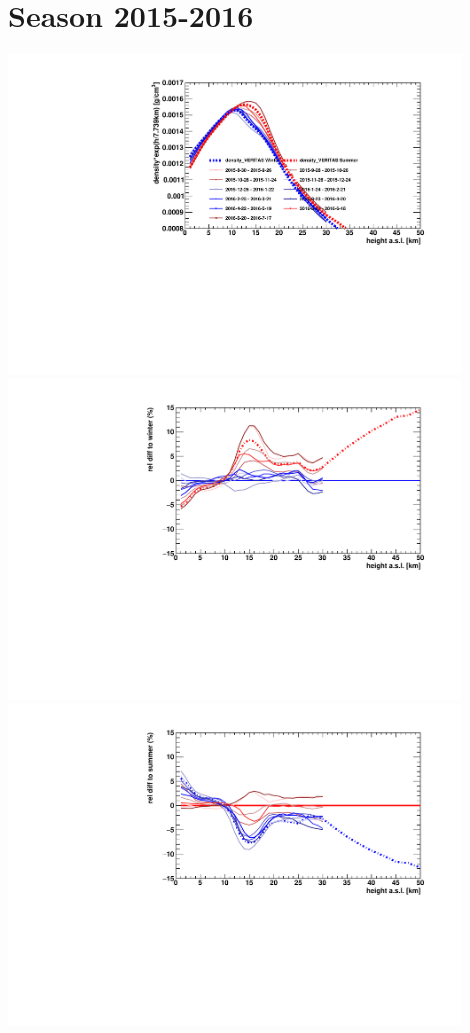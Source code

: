 \section*{Season 2015-2016}
\noindent\begin{minipage}{\textwidth}
\centering
\includegraphics[width=0.9\textwidth]{season-2015-2016-density.pdf}
\includegraphics[width=0.9\textwidth]{season-relativeWinter-2015-2016-density.pdf}
\includegraphics[width=0.9\textwidth]{season-relativeSummer-2015-2016-density.pdf}
\end{minipage}
